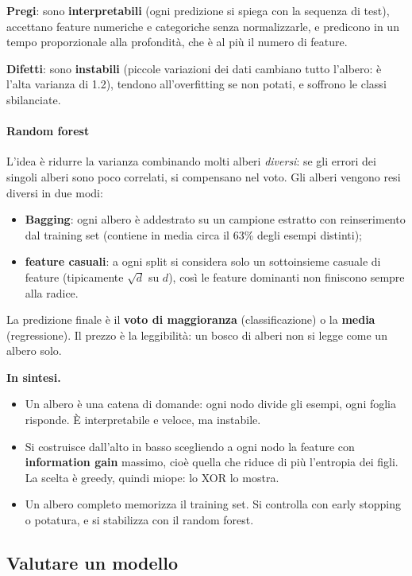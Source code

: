 \documentclass[12pt]{extarticle}
\begin{document}
\textbf{Pregi}: sono \textbf{interpretabili} (ogni predizione si spiega con la sequenza di test), accettano feature numeriche e categoriche senza normalizzarle, e predicono in un tempo proporzionale alla profondità, che è al più il numero di feature.

\noindent\textbf{Difetti}: sono \textbf{instabili} (piccole variazioni dei dati cambiano tutto l'albero: è l'alta varianza di 1.2), tendono all'overfitting se non potati, e soffrono le classi sbilanciate.

\paragraph{Random forest}
L'idea è ridurre la varianza combinando molti alberi \emph{diversi}: se gli errori dei singoli alberi sono poco correlati, si compensano nel voto. Gli alberi vengono resi diversi in due modi:
\begin{itemize}
    \item \textbf{Bagging}: ogni albero è addestrato su un campione estratto con reinserimento dal training set (contiene in media circa il 63\% degli esempi distinti);
    \item \textbf{feature casuali}: a ogni split si considera solo un sottoinsieme casuale di feature (tipicamente $\sqrt{d}$ su $d$), così le feature dominanti non finiscono sempre alla radice.
\end{itemize}
La predizione finale è il \textbf{voto di maggioranza} (classificazione) o la \textbf{media} (regressione). Il prezzo è la leggibilità: un bosco di alberi non si legge come un albero solo.

\noindent\textbf{In sintesi.}
\begin{itemize}
    \item Un albero è una catena di domande: ogni nodo divide gli esempi, ogni foglia risponde. È interpretabile e veloce, ma instabile.
    \item Si costruisce dall'alto in basso scegliendo a ogni nodo la feature con \textbf{information gain} massimo, cioè quella che riduce di più l'entropia dei figli. La scelta è greedy, quindi miope: lo XOR lo mostra.
    \item Un albero completo memorizza il training set. Si controlla con early stopping o potatura, e si stabilizza con il random forest.
\end{itemize}

\subsection{Valutare un modello}
\end{document}
